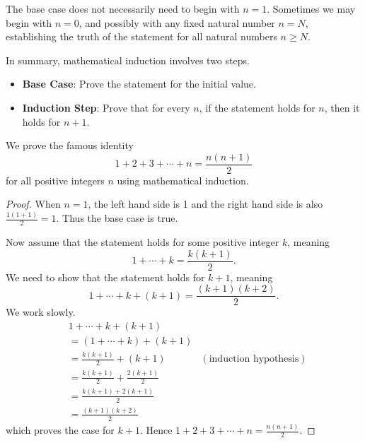 The base case does not necessarily need to begin with $n = 1$. Sometimes we may begin with $n = 0$, and possibly with any fixed natural number $n = N$, establishing the truth of the statement for all natural numbers $n \geq N$.

In summary, mathematical induction involves two steps.
\begin{itemize}
    \item \textbf{Base Case}: Prove the statement for the initial value.
    \item \textbf{Induction Step}: Prove that for every $n$, if the statement holds for $n$, then it holds for $n + 1$.
\end{itemize}

\begin{example}
    We prove the famous identity
    \[
        1 + 2 + 3 + \cdots + n = \frac{n(n+1)}2
    \]
    for all positive integers $n$ using mathematical induction.
    \begin{proof}
        When $n = 1$, the left hand side is 1 and the right hand side is also $\frac{1(1+1)}{2} = 1$. Thus the base case is true.

        Now assume that the statement holds for some positive integer $k$, meaning
        \[
            1 + \cdots + k = \frac{k(k+1)}2.
        \]
        We need to show that the statement holds for $k+1$, meaning
        \[
            1 + \cdots + k + (k+1) = \frac{(k+1)(k+2)}2.
        \]
        We work slowly.
        \begin{align*}
            &1 + \cdots + k + (k+1) \\
            &= (1 + \cdots + k) + (k+1)\\
            &= \frac{k(k+1)}{2} + (k+1) & (\text{induction hypothesis})\\
            &= \frac{k(k+1)}2 + \frac{2(k+1)}{2}\\
            &= \frac{k(k+1) + 2(k+1)}2\\
            &= \frac{(k+1)(k+2)}2
        \end{align*}
        which proves the case for $k + 1$. Hence $1 + 2 + 3 + \cdots + n = \frac{n(n+1)}2$.
    \end{proof}
\end{example}

